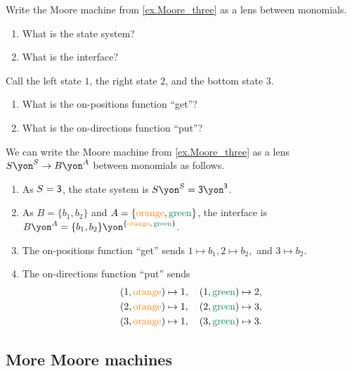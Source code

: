 \documentclass[Book-Poly]{subfiles}
\begin{document}
\begin{exercise}
Write the Moore machine from \cref{ex.Moore_three} as a lens between monomials.
\begin{enumerate}
    \item What is the state system?
    \item What is the interface?
\end{enumerate}
Call the left state $1$, the right state $2$, and the bottom state $3$.
\begin{enumerate}[resume]
    \item What is the on-positions function ``get''?
    \item What is the on-directions function ``put''? \qedhere
\end{enumerate}
\begin{solution}
We can write the Moore machine from \cref{ex.Moore_three} as a lens $S\yon^S\to B\yon^A$ between monomials as follows.
\begin{enumerate}
    \item As $S=\textsf{3}$, the state system is $S\yon^S=\3\yon^\3$.
    \item As $B=\{b_1,b_2\}$ and $A=\{{\color{orange}\text{orange}},{\color{dgreen}\text{green}}\}$, the interface is $B\yon^A=\{b_1,b_2\}\yon^{\{{\color{orange}\text{orange}},\,{\color{dgreen}\text{green}}\}}$.
    \item The on-positions function ``get'' sends $1\mapsto b_1, 2\mapsto b_2,$ and $3\mapsto b_2$.
    \item The on-directions function ``put'' sends
    \begin{align*}
        (1, {\color{orange}\text{orange}})\mapsto1&,\quad(1, {\color{dgreen}\text{green}})\mapsto2, \\
        (2, {\color{orange}\text{orange}})\mapsto1&,\quad(2, {\color{dgreen}\text{green}})\mapsto3, \\
        (3, {\color{orange}\text{orange}})\mapsto1&,\quad(3, {\color{dgreen}\text{green}})\mapsto3.
    \end{align*}
\end{enumerate}
\end{solution}
\end{exercise}

\subsection{More Moore machines}
\end{document}
